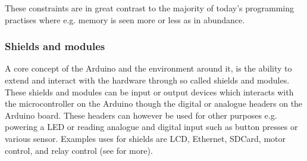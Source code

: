 These constraints are in great contrast to the majority of today's programming practises where e.g. memory is seen more or less as in abundance. 

\subsubsection{Shields and modules}
A core concept of the Arduino and the environment around it, is the ability to extend and interact with the hardware through so called shields and modules.
These shields and modules can be input or output devices which interacts with the microcontroller on the Arduino though the digital or analogue headers on the Arduino board.
These headers can however be used for other purposes e.g. powering a LED or reading analogue and digital input such as button presses or various sensor.
Examples uses for shields are LCD, Ethernet, SDCard, motor control, and relay control (see \cite{ArduinoShields} for more).
